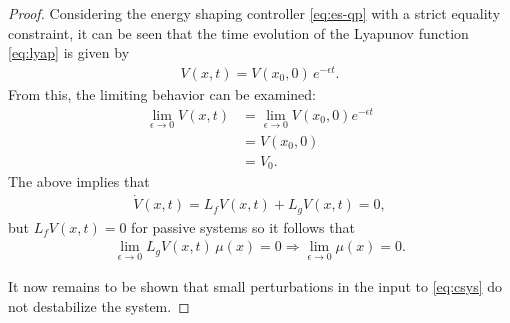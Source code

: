 \documentclass[twocolumn]{article}
\newcommand{\limeps}{\lim_{\epsilon \to 0}}
\begin{document}
\begin{proof}
  Considering the energy shaping controller \eqref{eq:es-qp} with a strict equality constraint, it can be seen that the time evolution of the Lyapunov function \eqref{eq:lyap} is given by
  \begin{align*}
    V(x, t) = V(x_{0}, 0) \, e^{-\epsilon t}.
  \end{align*}
  From this, the limiting behavior can be examined:
  \begin{align*}
    \limeps V(x, t) &= \limeps V(x_{0}, 0) e^{-\epsilon t}\\
    &= V(x_{0}, 0)\\
    &= V_0.
  \end{align*}
  The above implies that
  \begin{align*}
    {\dot V}(x, t) = L_{f} V(x, t) + L_{g} V(x, t) = 0,
  \end{align*}
  but $L_{f} V(x, t) = 0$ for passive systems so it follows that
  \begin{align*}
    \limeps L_{g} V(x, t) \, \mu(x) = 0 \Rightarrow \limeps \mu(x) = 0.
  \end{align*}

  It now remains to be shown that small perturbations in the input to \eqref{eq:csys} do not destabilize the system.
\end{proof}
\end{document}
